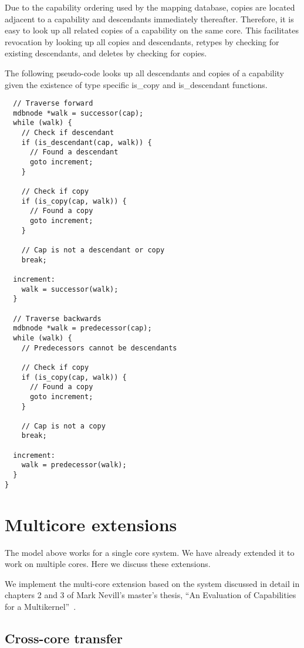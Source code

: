 \documentclass[a4paper,twoside]{report} %
\begin{document}
Due to the capability ordering used by the mapping database, copies are located
adjacent to a capability and descendants immediately thereafter. Therefore, it
is easy to look up all related copies of a capability on the same core. This
facilitates revocation by looking up all copies and descendants, retypes by
checking for existing descendants, and deletes by checking for copies.

The following pseudo-code looks up all descendants and copies of a
capability given the existence of type specific is\_copy and
is\_descendant functions.

{\scriptsize
\begin{verbatim}
  // Traverse forward
  mdbnode *walk = successor(cap);
  while (walk) {
    // Check if descendant
    if (is_descendant(cap, walk)) {
      // Found a descendant
      goto increment;
    }

    // Check if copy
    if (is_copy(cap, walk)) {
      // Found a copy
      goto increment;
    }

    // Cap is not a descendant or copy
    break;

  increment:
    walk = successor(walk);
  }

  // Traverse backwards
  mdbnode *walk = predecessor(cap);
  while (walk) {
    // Predecessors cannot be descendants

    // Check if copy
    if (is_copy(cap, walk)) {
      // Found a copy
      goto increment;
    }

    // Cap is not a copy
    break;

  increment:
    walk = predecessor(walk);
  }
}
\end{verbatim}
}

\section{Multicore extensions}

The model above works for a single core system. We have already
extended it to work on multiple cores. Here we discuss these
extensions.

We implement the multi-core extension based on the system discussed in detail
in chapters 2 and 3 of Mark Nevill's master's thesis, ``An Evaluation of
Capabilities for a Multikernel''~\cite{Nevill2012}.

\subsection{Cross-core transfer}
\end{document}
